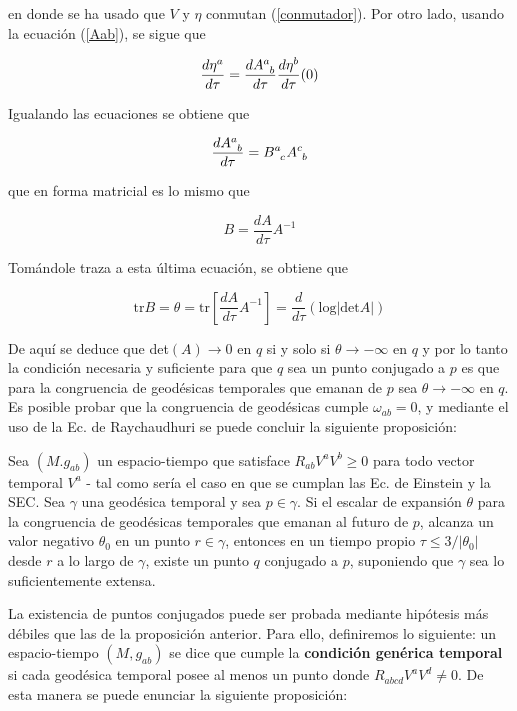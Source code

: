 en donde se ha usado que $V$ y $\eta$ conmutan (\ref{conmutador}). Por otro lado, usando la ecuación (\ref{Aab}), se sigue que

$$
\frac{d\eta^a}{d\tau}=\frac{d\tensor{A}{^a_b}}{d\tau}\frac{d\eta^b}{d\tau}(0)
$$

Igualando las ecuaciones se obtiene que

$$
\frac{d\tensor{A}{^a_b}}{d\tau}=\tensor{B}{^a_c}\tensor{A}{^c_b}
$$

que en forma matricial es lo mismo que 

$$
B=\frac{dA}{d\tau}A^{-1}
$$

Tomándole traza a esta última ecuación, se obtiene que

$$
\text{tr} B=\theta=\text{tr}\left[\frac{dA}{d\tau}A^{-1}\right]=\frac{d}{d\tau}(\text{log}|\text{det}A|)
$$

De aquí se deduce que det$(A)\rightarrow0$ en $q$ si y solo si $\theta\rightarrow -\infty$ en $q$ y por lo tanto la condición necesaria y suficiente para que $q$ sea un punto conjugado a $p$ es que para la congruencia de geodésicas temporales que emanan de $p$ sea $\theta\rightarrow -\infty$ en $q$. Es posible probar \citep{1984ucp..book.....W} que la congruencia de geodésicas cumple $\omega_{ab}=0$, y mediante el uso de la Ec. de Raychaudhuri se puede concluir la siguiente proposición:

\begin{proposition}\label{prop pts conjugados}
Sea $(M.g_{ab})$ un espacio-tiempo que satisface $R_{ab}V^aV^b\geq0$ para todo vector temporal $V^a$ - tal como sería el caso en que se cumplan las Ec. de Einstein y la SEC. Sea $\gamma$ una geodésica temporal y sea $p\in \gamma$. Si el escalar de expansión $\theta$ para la congruencia de geodésicas temporales que emanan al futuro de $p$, alcanza un valor negativo $\theta_0$ en un punto $r\in \gamma$, entonces en un tiempo propio $\tau\leq 3/|\theta_0|$ desde $r$ a lo largo de $\gamma$, existe un punto $q$ conjugado a $p$, suponiendo que $\gamma$ sea lo suficientemente extensa.
\end{proposition}

La existencia de puntos conjugados puede ser probada mediante hipótesis más débiles que las de la proposición anterior. Para ello, definiremos lo siguiente: un espacio-tiempo $(M,g_{ab})$ se dice que cumple la \textbf{condición genérica temporal} si cada geodésica temporal posee al menos un punto donde $R_{abcd}V^aV^d\neq0$. De esta manera se puede enunciar la siguiente proposición:

